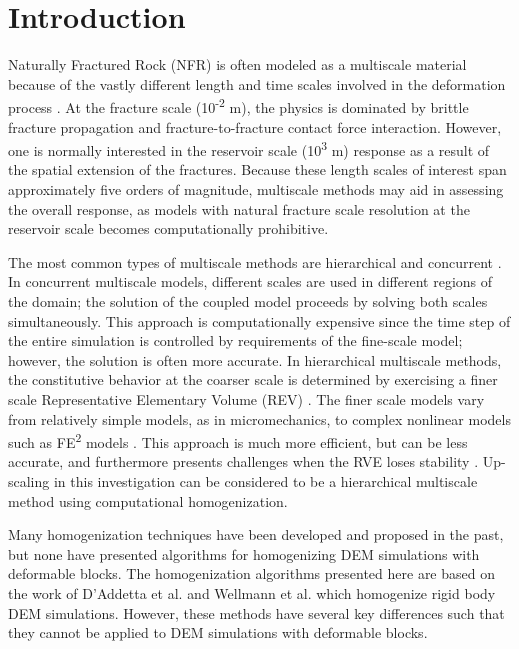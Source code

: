 \section{Introduction}
Naturally Fractured Rock (NFR) is often modeled as a multiscale material because of the vastly different length and time scales involved in the deformation process \citep{zhou_flow_2003}. At the fracture scale (10\textsuperscript{-2} m), the physics is dominated by brittle fracture propagation and fracture-to-fracture contact force interaction. However, one is normally interested in the reservoir scale (10\textsuperscript{3} m) response as a result of the spatial extension of the fractures. Because these length scales of interest span approximately five orders of magnitude, multiscale methods may aid in assessing the overall response, as models with natural fracture scale resolution at the reservoir scale becomes computationally prohibitive.

The most common types of multiscale methods are hierarchical and concurrent \citep{Gracie_2011}. In concurrent multiscale models, different scales are used in different regions of the domain; the solution of the coupled model proceeds by solving both scales simultaneously. This approach is computationally expensive since the time step of the entire simulation is controlled by requirements of the fine-scale model; however, the solution is often more accurate.  In hierarchical multiscale methods, the constitutive behavior at the coarser scale is determined by exercising a finer scale Representative Elementary Volume (REV) \citep{Li_2014}. The finer scale models vary from relatively simple models, as in micromechanics, to complex nonlinear models such as FE\textsuperscript{2} models \citep{Feyel_2003}. This approach is much more efficient, but can be less accurate, and furthermore  presents challenges when the RVE loses stability \citep{Belytschko_2008}. Up-scaling in this investigation can be considered to be a hierarchical multiscale method using computational homogenization. 

Many homogenization techniques have been developed and proposed in the past, but none have presented algorithms for homogenizing DEM simulations with deformable blocks. The homogenization algorithms presented here are based on the work of D'Addetta et al. \citet{daddetta_particle_2004} and Wellmann et al. \citet{wellmann_homogenization_2008} which homogenize rigid body DEM simulations. However, these methods have several key differences such that they cannot be applied to DEM simulations with deformable blocks.

